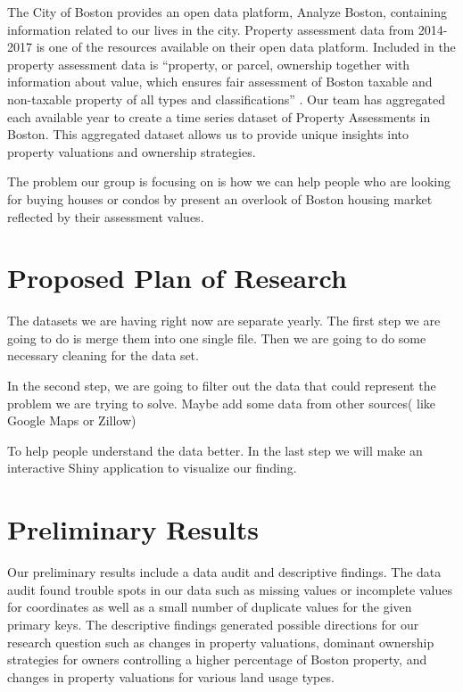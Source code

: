\documentclass[12pt]{article}
\begin{document}
The City of Boston provides an open data platform, Analyze Boston, 
containing information related to our lives in the city. Property 
assessment data from 2014-2017 is one of the resources available on their
 open data platform. Included in the property assessment data is 
``property, or parcel, ownership together with information about value, 
which ensures fair assessment of Boston taxable and non-taxable property 
of all types and classifications'' \cite{Property49:online}. Our team 
has aggregated each available year to create a time series dataset of 
Property Assessments in Boston. This aggregated dataset allows us to 
provide unique insights into property valuations and ownership strategies.

The problem our group is focusing on is how we can help people who are 
looking for buying houses or condos by present an overlook of Boston 
housing market reflected by their assessment values.

\section{Proposed Plan of Research}

 The datasets we are having right now are separate yearly. The first step 
we are going to do is merge them into one single file. Then we are going 
to do some necessary cleaning for the data set. 

In the second step, we are going to filter out the data that could 
represent the problem we are trying to solve. Maybe add some data from 
other sources( like Google Maps or Zillow)

To help people understand the data better. In the last step we will make 
an interactive Shiny application to visualize our finding. 


\section{Preliminary Results}

Our preliminary results include a data audit and descriptive findings.
The data audit found trouble spots in our data such as missing values or
incomplete values for coordinates as well as a small number of duplicate
values for the given primary keys. The descriptive findings generated
possible directions for our research question such as changes in 
property valuations, dominant ownership strategies for owners 
controlling a higher percentage of Boston property, and changes in
property valuations for various land usage types.
\end{document}
